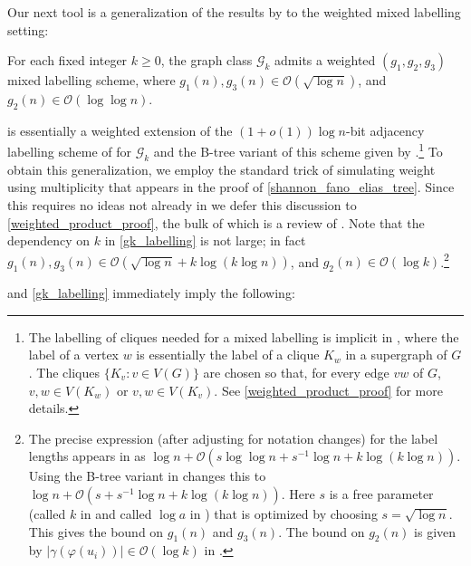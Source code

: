 \documentclass{patmorin}
\renewcommand{\ge}{\geqslant}
\newcommand{\Oh}{\mathcal{O}}
\begin{document}
  Our next tool is a generalization of the results by  \citet{dujmovic.esperet.ea:adjacency} to the weighted mixed labelling setting:

  \begin{thm}\label{gk_labelling}
    For each fixed integer $k\ge 0$, the graph class $\mathcal{G}_{k}$
    admits a weighted $(g_1,g_2,g_3)$ mixed labelling scheme, where $g_1(n),g_3(n)\in \Oh(\sqrt{\log n})$, and $g_2(n)\in \Oh(\log\log n)$.
  \end{thm}


  \label{sketch_start}
   is essentially a weighted extension of the $(1+o(1))\log n$-bit adjacency labelling scheme of \citet{dujmovic.esperet.ea:adjacency} for $\mathcal{G}_k$ and the B-tree variant of this scheme given by \citet{gawrychowski.janczewski:simpler}.\footnote{The labelling of cliques needed for a mixed labelling is implicit in \cite{dujmovic.esperet.ea:adjacency}, where the label of a vertex $w$ is essentially the label of a clique $K_w$ in a supergraph of $G$. The cliques $\{K_v:v\in V(G)\}$ are chosen so that, for every edge $vw$ of $G$, $v,w\in V(K_w)$ or $v,w\in V(K_v)$. See \cref{weighted_product_proof} for more details.}  To obtain this generalization, we employ the standard trick of simulating weight using multiplicity that appears in the proof of \cref{shannon_fano_elias_tree}.  Since this requires no ideas not already in \cite{gawrychowski.janczewski:simpler,dujmovic.esperet.ea:adjacency} we defer this discussion to \cref{weighted_product_proof}, the bulk of which is a review of \cite{gawrychowski.janczewski:simpler,dujmovic.esperet.ea:adjacency}.  Note that the dependency on $k$ in \cref{gk_labelling} is not large; in fact $g_1(n),g_3(n)\in \Oh(\sqrt{\log n} + k\log(k\log n))$, and $g_2(n)\in\Oh(\log k)$.\footnote{The precise expression (after adjusting for notation changes) for the label lengths appears in  \cite[Section 5.4]{dujmovic.esperet.ea:adjacency} as $\log n + \Oh(s\log \log n + s^{-1}\log n + k\log (k\log n))$.  Using the B-tree variant in \cite{gawrychowski.janczewski:simpler} changes this to $\log n + \Oh(s + s^{-1}\log n + k\log(k\log n))$.  Here $s$ is a free parameter (called $k$ in \cite{dujmovic.esperet.ea:adjacency} and called $\log a$ in \cite{gawrychowski.janczewski:simpler}) that is optimized by choosing $s=\sqrt{\log n}$. This gives the bound on $g_1(n)$ and $g_3(n)$.  The bound on $g_2(n)$ is given by $|\gamma(\varphi(u_i))|\in \Oh(\log k)$ in  \cite[Section 5.4]{dujmovic.esperet.ea:adjacency}.}


   and \cref{gk_labelling} immediately imply the following:
\end{document}
